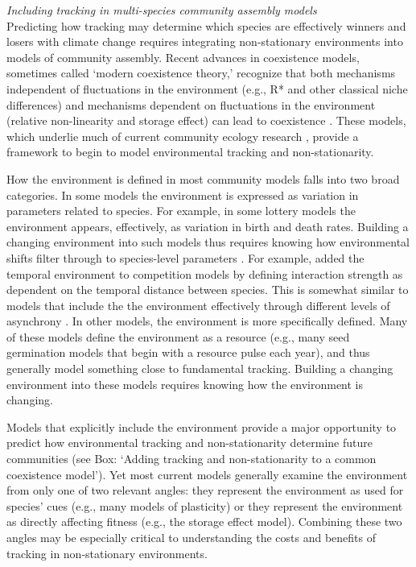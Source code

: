 \documentclass[11pt,letterpaper]{article}
\newcommand{\R}[1]{\label{#1}\linelabel{#1}}
\begin{document}
\emph{Including tracking in multi-species community assembly models} \\
\R{startmodels}Predicting how tracking may determine which species are effectively winners and losers with climate change requires integrating non-stationary environments into models of community assembly. Recent advances in coexistence models, sometimes called `modern coexistence theory,' recognize that both mechanisms independent of fluctuations in the environment (e.g., R* and other classical niche differences) and mechanisms dependent on fluctuations in the environment (relative non-linearity and storage effect) can lead to coexistence \citep{Chesson:1997dz,Chesson:2000vd}. These models, which underlie much of current community ecology research \citep{Mayfield:2010fe,barabas2018,ellner2019}, provide a framework to begin to model environmental tracking and non-stationarity. 

How the environment is defined in most community models falls into two broad categories. In some models the environment is expressed as variation in parameters related to species. For example, in some lottery models the environment appears, effectively, as variation in birth and death rates. \R{S2start}Building a changing environment into such models thus requires knowing how environmental shifts filter through to species-level parameters \citep{Tuljapurkar2009}. For example, \citet{volkerass} added the temporal environment to competition models by defining interaction strength as dependent on the temporal distance between species. This is somewhat similar to models that include the the environment effectively through different levels of asynchrony \citep[e.g.,][]{Nakazawa2012,revilla2014}. \R{S2end}In other models, the environment is more specifically defined. Many of these models define the environment as a resource (e.g., many seed germination models that begin with a resource pulse each year), and thus generally model something close to fundamental tracking. Building a changing environment into these models requires knowing how the environment is changing.

Models that explicitly include the environment provide a major opportunity to predict how environmental tracking and non-stationarity determine future communities (see Box: `Adding tracking and non-stationarity to a common coexistence model'). Yet most current models generally examine the environment from only one of two relevant angles: they represent the environment as used for species' cues (e.g., many models of plasticity) or they represent the environment as directly affecting fitness (e.g., the storage effect model). Combining these two angles may be especially critical to understanding the costs and benefits of tracking in non-stationary environments. \R{modelcosts1} 
\end{document}
